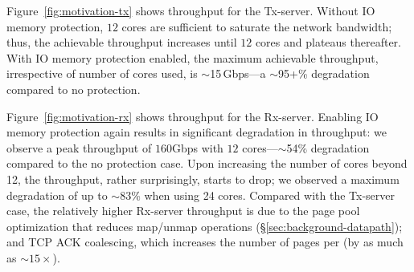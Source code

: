 Figure~\ref{fig:motivation-tx} shows throughput for the Tx-server.
Without IO memory protection, $12$ cores are sufficient to saturate the network bandwidth; thus, the achievable throughput increases until $12$ cores and plateaus thereafter.
With IO memory protection enabled, the maximum achievable throughput, 
  irrespective of number of cores used, 
  is ${\sim}$15\,Gbps---a ${\sim}$95+\% degradation 
  compared to no protection.

Figure~\ref{fig:motivation-rx} shows throughput for the Rx-server.
Enabling IO memory protection again results in significant degradation in throughput: we observe a peak throughput of $160$Gbps with $12$ cores---{$\sim$}54\% degradation compared to the no protection case. 
Upon increasing the number of cores beyond 12, the throughput, rather surprisingly, 
  starts to drop; we observed a maximum degradation of up to $\sim$83\% when using 24 cores. 
Compared with the Tx-server case, the relatively higher Rx-server throughput is due to the page pool optimization that reduces map/unmap operations (\S\ref{sec:background-datapath}); and TCP ACK coalescing, which increases the number of pages 
  per  (by as much as ${\sim}15\times$).


